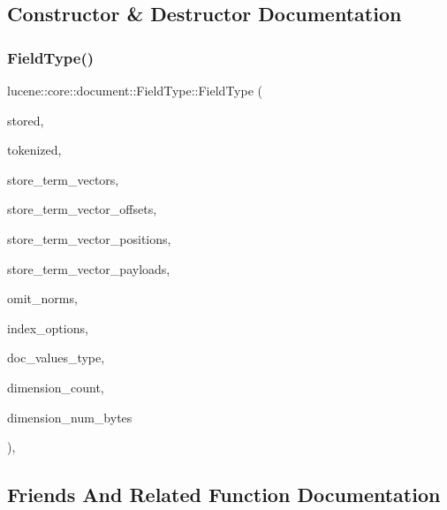 \subsection{Constructor \& Destructor Documentation}
\mbox{\label{classlucene_1_1core_1_1document_1_1FieldType_ac1f2724c5c5cfc63b7c29021d3524c12}} 
\subsubsection{\texorpdfstring{Field\+Type()}{FieldType()}}
{\footnotesize\ttfamily lucene\+::core\+::document\+::\+Field\+Type\+::\+Field\+Type (\begin{DoxyParamCaption}\item[{const bool}]{stored,  }\item[{const bool}]{tokenized,  }\item[{const bool}]{store\+\_\+term\+\_\+vectors,  }\item[{const bool}]{store\+\_\+term\+\_\+vector\+\_\+offsets,  }\item[{const bool}]{store\+\_\+term\+\_\+vector\+\_\+positions,  }\item[{const bool}]{store\+\_\+term\+\_\+vector\+\_\+payloads,  }\item[{const bool}]{omit\+\_\+norms,  }\item[{const \mbox{\hyperlink{namespacelucene_1_1core_1_1index_a0d5e1f98471a76de106056cf3b5a7897}{lucene\+::core\+::index\+::\+Index\+Options}}}]{index\+\_\+options,  }\item[{const \mbox{\hyperlink{namespacelucene_1_1core_1_1index_a2f7ffaef6429b5df542c8aa12f8b9883}{lucene\+::core\+::index\+::\+Doc\+Values\+Type}}}]{doc\+\_\+values\+\_\+type,  }\item[{const uint32\+\_\+t}]{dimension\+\_\+count,  }\item[{const uint32\+\_\+t}]{dimension\+\_\+num\+\_\+bytes }\end{DoxyParamCaption})\hspace{0.3cm}{\ttfamily [inline]}, {\ttfamily [private]}}



\subsection{Friends And Related Function Documentation}
\mbox{\label{classlucene_1_1core_1_1document_1_1FieldType_a3fb44009cf30f7bfb252cc034982cbad}} 
